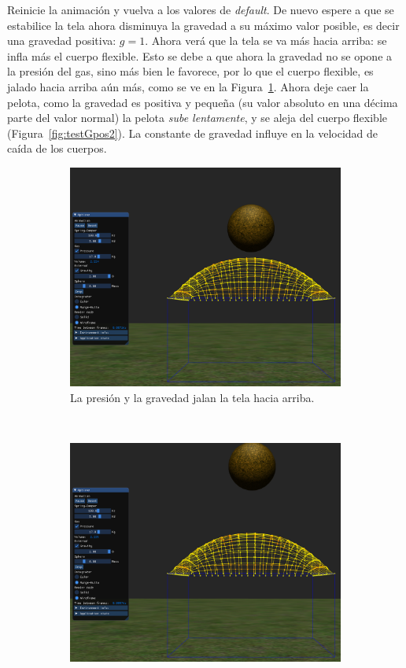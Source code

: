 Reinicie la animación y vuelva a los valores de \emph{\textenglish{default}}.
De nuevo espere a que se estabilice la tela ahora disminuya la gravedad a su máximo valor posible, es decir una gravedad positiva: $g=1$.
Ahora verá que la tela se va más hacia arriba: se infla más el cuerpo flexible. 
Esto se debe a que ahora la gravedad no se opone a la presión del gas, sino más bien le favorece, por lo que el cuerpo flexible, es jalado hacia arriba aún más, como se ve en la Figura~\ref{fig:testGpos1}.
Ahora deje caer la pelota, como la gravedad es positiva y pequeña (su valor absoluto en una décima parte del valor normal) la pelota \emph{sube lentamente}, y se aleja del cuerpo flexible (Figura~\ref{fig:testGpos2}).
La constante de gravedad influye en la velocidad de caída de los cuerpos.

\begin{figure}
 \centering
  \begin{subfigure}[b]{0.45\textwidth}
    \includegraphics[width=\textwidth]{img/04/positiveGravity1}
    \caption{La presión y la gravedad jalan la tela hacia arriba.}
    \label{fig:testGpos1}
  \end{subfigure}
~
  \begin{subfigure}[b]{0.45\textwidth}
    \includegraphics[width=\textwidth]{img/04/positiveGravity2}

\end{subfigure}
\end{figure}

